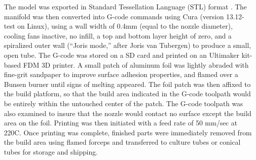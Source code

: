 \documentclass[fleqn,10pt]{wlpeerj}
\begin{document}
The model was exported in Standard Tessellation Language (STL) format
\cite{burns1993}. The manifold was then converted into G-code commands
\cite{gcode} using Cura (version 13.12-test on Linux), using a wall width of
0.4mm (equal to the nozzle diameter), cooling fans inactive, no infill, a top
and bottom layer height of zero, and a spiralized outer wall (``Joris mode,''
after Joris van Tubergen) to produce a small, open tube.  The G-code was
stored on a SD card and printed on an Ultimaker kit-based FDM 3D printer. A
small patch of aluminum foil was lightly abraded with fine-grit sandpaper to
improve surface adhesion properties, and flamed over a Bunsen burner until
signs of melting appeared. The foil patch was then affixed to the build
platform, so that the build area indicated in the G-code toolpath would be
entirely within the untouched center of the patch. The G-code toolpath was
also examined to insure that the nozzle would contact no surface except the
build area on the foil. Printing was then initiated with a feed rate of 50
mm/sec at 220C. Once printing was complete, finished parts were immediately
removed from the build area using flamed forceps and transferred to culture
tubes or conical tubes for storage and shipping.
\end{document}
